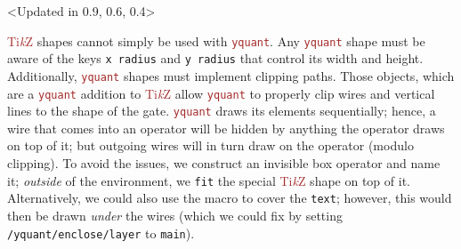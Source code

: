 \documentclass{scrartcl}
\makeatletter
\newenvironment{codeexample*}{%
   \VerbatimEnvironment%
   \let\FVB@VerbatimOut\minted@FVB@VerbatimOut
   \let\FVE@VerbatimOut\minted@FVE@VerbatimOut
   \minted@configlang{tex}%
   \minted@fvset
   \begin{VerbatimOut}[codes={\catcode`\^^I=12},firstline,lastline]{\minted@jobname.pyg}%
}{
   \end{VerbatimOut}%
   \minted@langlinenoson%
   \begin{adjustbox}{center}
       \minted@jobname.pyg %
   \end{adjustbox}\nopagebreak
   \expandafter\minted@pygmentize\expandafter{\minted@lang}%
   \minted@langlinenosoff%
   \par%
}
\def\TikZ{\textcolor{brown}{Ti\textit kZ}}
\def\pkg#1{\textcolor{brown}{\texttt{#1}}}
\def\ttlink{\link\texttt}
\def\texlink{\link\tex}
\def\Yquant{\pkg{yquant}}
\makeatother
\begin{document}
               \begin{example}<Updated in 0.9, 0.6, 0.4>
                  \begin{codeexample*}
                  \end{codeexample*}
                  \TikZ{} shapes cannot simply be used with \Yquant.
                  Any \Yquant{} shape must be aware of the keys \texttt{x radius} and \texttt{y radius} that control its width and height.
                  Additionally, \Yquant{} shapes must implement clipping paths.
                  Those objects, which are a \Yquant{} addition to \TikZ{} allow \Yquant{} to properly clip wires and vertical lines to the shape of the gate.
                  \Yquant{} draws its elements sequentially; hence, a wire that comes into an operator will be hidden by anything the operator draws on top of it; but outgoing wires will in turn draw on the operator (modulo clipping).
                  To avoid the issues, we construct an invisible box operator and name it; \emph{outside} of the \texlink{yquant} environment, we \texttt{fit} the special \TikZ{} shape on top of it.
                  Alternatively, we could also use the \texlink{\enclose} macro to cover the \ttlink{text}; however, this would then be drawn \emph{under} the wires (which we could fix by setting \ttlink{/yquant/enclose/layer} to \texttt{main}).
               \end{example}
\end{document}
